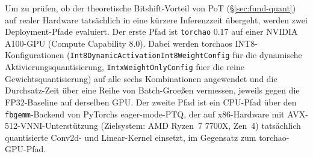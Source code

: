 Um zu prüfen, ob der theoretische Bitshift-Vorteil von PoT (\S\ref{sec:fund-quant}) auf realer Hardware tatsächlich in eine kürzere Inferenzzeit übergeht, werden zwei Deployment-Pfade evaluiert. Der erste Pfad ist \texttt{torchao} 0.17 auf einer NVIDIA A100-GPU (Compute Capability 8.0). Dabei werden torchaos INT8-Konfigurationen (\texttt{Int8DynamicActivationInt8WeightConfig} für die dynamische Aktivierungsquantisierung, \texttt{IntxWeightOnlyConfig} fuer die reine Gewichtsquantisierung) auf alle sechs Kombinationen angewendet und die Durchsatz-Zeit über eine Reihe von Batch-Groeßen vermessen, jeweils gegen die FP32-Baseline auf derselben GPU. Der zweite Pfad ist ein CPU-Pfad über den \texttt{fbgemm}-Backend \citep{khudia_fbgemm_2021} von PyTorchs eager-mode-PTQ, der auf x86-Hardware mit AVX-512-VNNI-Unterstützung (Zielsystem: AMD Ryzen~7 7700X, Zen~4) tatsächlich quantisierte Conv2d- und Linear-Kernel einsetzt, im Gegensatz zum torchao-GPU-Pfad.